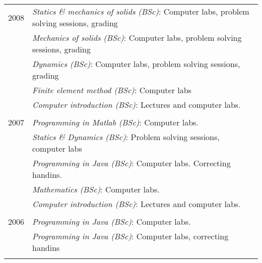 \documentclass[a4paper,10pt]{article} %
\begin{document}
\begin{tabular}{r|p{11cm}}

\textsc{2008} 
              & \emph{Statics \& mechanics of solids (BSc)}: \footnotesize{Computer labs, problem solving sessions, grading}\\
              & \emph{Mechanics of solids (BSc)}: \footnotesize{Computer labs, problem solving sessions, grading}\\
              & \emph{Dynamics (BSc)}: \footnotesize{Computer labs, problem solving sessions, grading}\\
              & \emph{Finite element method (BSc)}: \footnotesize{Computer labs}\\
              & \emph{Computer introduction (BSc)}: \footnotesize{Lectures and computer labs.}\\
\multicolumn{2}{c}{} \\


\textsc{2007} 
              & \emph{Programming in Matlab (BSc)}: \footnotesize{Computer labs.}\\
              & \emph{Statics \& Dynamics (BSc)}: \footnotesize{Problem solving sessions, computer labs}\\
              & \emph{Programming in Java (BSc)}: \footnotesize{Computer labs. Correcting handins.}\\
              & \emph{Mathematics (BSc)}: \footnotesize{Computer labs.}\\
              & \emph{Computer introduction (BSc)}: \footnotesize{Lectures and computer labs.}\\
\multicolumn{2}{c}{} \\


\textsc{2006} 
              & \emph{Programming in Java (BSc)}: \footnotesize{Computer labs.}\\
              & \emph{Programming in Java (BSc)}: \footnotesize{Computer labs, correcting handins}\\
\multicolumn{2}{c}{} \\

% 

\end{tabular}
\end{document}
